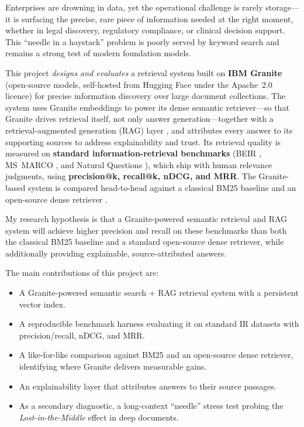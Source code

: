 Enterprises are drowning in data, yet the operational challenge is rarely
storage---it is surfacing the precise, rare piece of information needed at the
right moment, whether in legal discovery, regulatory compliance, or clinical
decision support. This ``needle in a haystack'' problem is poorly served by
keyword search and remains a strong test of modern foundation models.

This project \emph{designs and evaluates} a retrieval system built on
\textbf{IBM Granite} (open-source models, self-hosted from Hugging Face under
the Apache~2.0 licence) for precise information discovery over large document
collections. The system uses Granite embeddings to power its
dense semantic retriever---so that Granite drives retrieval itself, not only
answer generation---together with a retrieval-augmented generation (RAG) layer
\parencite{lewis2020rag}, and attributes every answer to its supporting sources
to address explainability and trust. Its retrieval quality is measured on \textbf{standard information-retrieval
benchmarks} (BEIR \parencite{thakur2021beir}, MS~MARCO \parencite{nguyen2016msmarco},
and Natural Questions \parencite{kwiatkowski2019nq}), which ship with human
relevance judgments, using \textbf{precision@k, recall@k, nDCG, and MRR}. The
Granite-based system is compared head-to-head against a classical BM25 baseline
\parencite{robertson2009bm25} and an open-source dense retriever
\parencite{karpukhin2020dpr}.

My research hypothesis is that a Granite-powered semantic retrieval and RAG
system will achieve higher precision and recall on these benchmarks than both
the classical BM25 baseline and a standard open-source dense retriever, while
additionally providing explainable, source-attributed answers.

The main contributions of this project are:

\begin{itemize}
  \item A Granite-powered semantic search + RAG retrieval system with a
        persistent vector index.
  \item A reproducible benchmark harness evaluating it on standard IR datasets
        with precision/recall, nDCG, and MRR.
  \item A like-for-like comparison against BM25 and an open-source dense
        retriever, identifying where Granite delivers measurable gains.
  \item An explainability layer that attributes answers to their source passages.
  \item As a secondary diagnostic, a long-context ``needle'' stress test probing
        the \emph{Lost-in-the-Middle} effect \parencite{liu2024lost} in deep
        documents.
\end{itemize}
